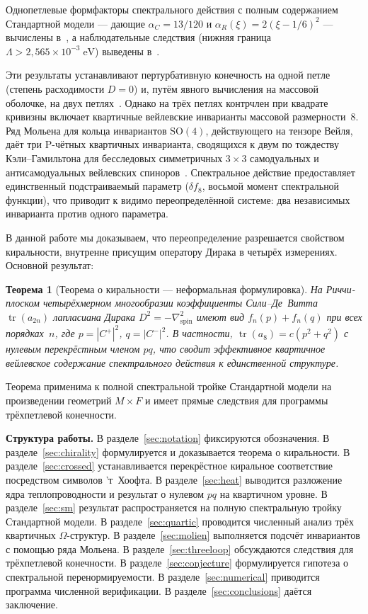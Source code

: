 \documentclass[12pt,a4paper]{article}
\newtheorem{theorem}{Теорема}[section]
\theoremstyle{definition}
\theoremstyle{remark}
\newcommand{\tr}{\operatorname{tr}}
\newcommand{\Lam}{\Lambda}
\begin{document}
Однопетлевые формфакторы спектрального действия с полным содержанием
Стандартной модели --- дающие $\alpha_C = 13/120$ и
$\alpha_R(\xi) = 2(\xi - 1/6)^2$ --- вычислены
в~\cite{Alfyorov:2026ff}, а наблюдательные следствия (нижняя граница
$\Lam > 2{,}565 \times 10^{-3}\;\mathrm{eV}$) выведены
в~\cite{Alfyorov:2026ss}.

Эти результаты устанавливают пертурбативную конечность на одной петле
(степень расходимости $D = 0$) и, путём явного вычисления на массовой
оболочке, на двух петлях~\cite{Goroff:1985th,Stelle:1976gc}.  Однако на трёх
петлях контрчлен при квадрате кривизны включает квартичные вейлевские
инварианты массовой размерности~8.  Ряд Мольена для кольца инвариантов
$\mathrm{SO}(4)$, действующего на тензоре Вейля, даёт три P-чётных квартичных инварианта, сводящихся к двум по тождеству
Кэли--Гамильтона для бесследовых симметричных $3 \times 3$
самодуальных и антисамодуальных вейлевских
спиноров~\cite{Fulling:1992vm}.  Спектральное действие предоставляет единственный
подстраиваемый параметр ($\delta f_8$, восьмой момент спектральной функции),
что приводит к видимо переопределённой системе: два независимых инварианта
против одного параметра.

В данной работе мы доказываем, что переопределение разрешается свойством
киральности, внутренне присущим оператору Дирака в четырёх измерениях.
Основной результат:

\begin{theorem}[Теорема о киральности --- неформальная формулировка]
\label{thm:informal}
На Риччи-плоском четырёхмерном многообразии коэффициенты Сили--Де~Витта
$\tr(a_{2n})$ лапласиана Дирака $D^2 = -\nabla^2_{\mathrm{spin}}$
имеют вид $f_n(p) + f_n(q)$ при всех порядках~$n$, где
$p = |C^+|^2$, $q = |C^-|^2$.  В частности, $\tr(a_8) = c(p^2 + q^2)$
с нулевым перекрёстным членом $pq$, что сводит эффективное квартичное
вейлевское содержание спектрального действия к единственной структуре.
\end{theorem}

\noindent Теорема применима к полной спектральной тройке Стандартной модели на
произведении геометрий $M \times F$ и имеет прямые следствия для программы
трёхпетлевой конечности.

\medskip
\noindent\textbf{Структура работы.}
В разделе~\ref{sec:notation} фиксируются обозначения.
В разделе~\ref{sec:chirality} формулируется и доказывается теорема о
киральности.  В разделе~\ref{sec:crossed} устанавливается перекрёстное
киральное соответствие посредством символов 'т~Хоофта.
В разделе~\ref{sec:heat} выводится разложение ядра теплопроводности и
результат о нулевом $pq$ на квартичном уровне.
В разделе~\ref{sec:sm} результат распространяется на полную спектральную
тройку Стандартной модели.  В разделе~\ref{sec:quartic} проводится численный
анализ трёх квартичных $\Omega$-структур.
В разделе~\ref{sec:molien} выполняется подсчёт инвариантов с помощью ряда
Мольена.  В разделе~\ref{sec:threeloop} обсуждаются следствия для
трёхпетлевой конечности.  В разделе~\ref{sec:conjecture} формулируется
гипотеза о спектральной перенормируемости.
В разделе~\ref{sec:numerical} приводится программа численной верификации.
В разделе~\ref{sec:conclusions} даётся заключение.
\end{document}
